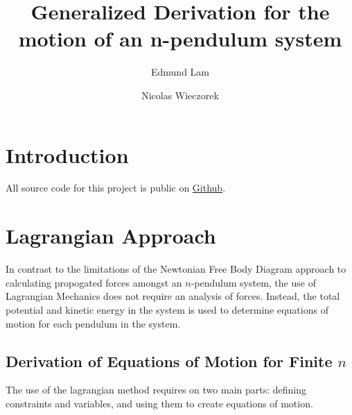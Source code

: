 \documentclass{article}
\title{Generalized Derivation for the motion of an n-pendulum system}
\author{Edmund Lam \and Nicolas Wieczorek}
\begin{document}
\begin{titlepage}
	\maketitle
	\thispagestyle{empty}
\end{titlepage}
\newpage
  \tableofcontents
\newpage

\section{Introduction}
All source code for this project is public on \href{https://github.com/UnsignedByte/n-pendulums}{Github}.

\section{Lagrangian Approach}
In contrast to the limitations of the Newtonian Free Body Diagram approach to calculating propogated forces amongst an $n$-pendulum system, the use of Lagrangian Mechanics does not require an analysis of forces. Instead, the total potential and kinetic energy in the system is used to determine equations of motion for each pendulum in the system.
\subsection{Derivation of Equations of Motion for Finite \texorpdfstring{$n$}{n}}
The use of the lagrangian method requires on two main parts: defining constraints and variables, and using them to create equations of motion.
\end{document}
